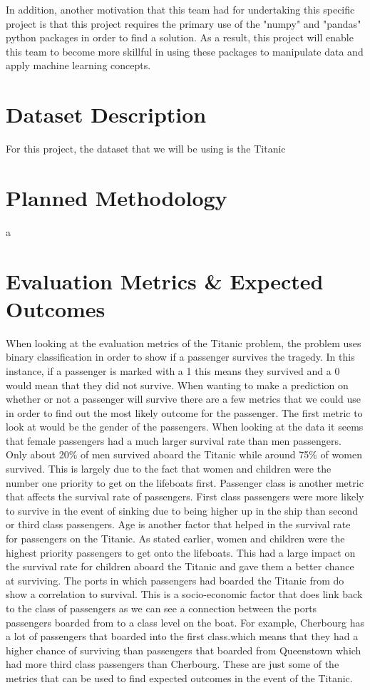 \documentclass{APA}
\begin{document}
In addition, another motivation that this team had for undertaking this specific project is that this project requires the primary use of the "numpy" and "pandas" python packages in order to find a solution. As a result, this project will enable this team to become more skillful in using these packages to manipulate data and apply machine learning concepts.
\newpage



\section{Dataset Description}
	For this project, the dataset that we will be using is the Titanic 
\newpage



\section{Planned Methodology}
a
\newpage



\section{Evaluation Metrics \& Expected Outcomes}
	When looking at the evaluation metrics of the Titanic problem, the problem uses binary classification in order to show if a passenger survives the tragedy. In this instance, if a passenger is marked with a 1 this means they survived and a 0 would mean that they did not survive. When wanting to make a prediction on whether or not a passenger will survive there are a few metrics that we could use in order to find out the most likely outcome for the passenger.
	The first metric to look at would be the gender of the passengers. When looking at the data it seems that female passengers had a much larger survival rate than men passengers. Only about 20\% of men survived aboard the Titanic while around 75\% of women survived. This is largely due to the fact that women and children were the number one priority to get on the lifeboats first. Passenger class is another metric that affects the survival rate of passengers. First class passengers were more likely to survive in the event of sinking due to being higher up in the ship than second or third class passengers. Age is another factor that helped in the survival rate for passengers on the Titanic. As stated earlier, women and children were the highest priority passengers to get onto the lifeboats. This had a large impact on the survival rate for children aboard the Titanic and gave them a better chance at surviving. The ports in which passengers had boarded the Titanic from do show a correlation to survival. This is a socio-economic factor that does link back to the class of passengers as we can see a connection between the ports passengers boarded from to a class level on the boat. For example, Cherbourg has a lot of passengers that boarded into the first class.which means that they had a higher chance of surviving than passengers that boarded from Queenstown which had more third class passengers than Cherbourg. These are just some of the metrics that can be used to find expected outcomes in the event of the Titanic.
\end{document}
